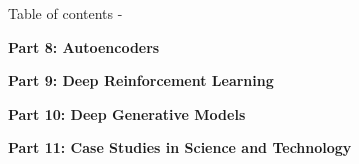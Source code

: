 \begin{frame}[allowframebreaks,t]{Table of contents -}
\vspace{0.2cm}

{\bf Part 8: Autoencoders}\\
\vspace{0.2cm}
\tableofcontents[part=8]

\vspace{0.2cm}

{\bf Part 9: Deep Reinforcement Learning}\\
\vspace{0.2cm}
\tableofcontents[part=9]

\vspace{0.2cm}

{\bf Part 10: Deep Generative Models}\\
\vspace{0.2cm}
\tableofcontents[part=10]

\vspace{0.2cm}

{\bf Part 11: Case Studies in Science and Technology}\\
\vspace{0.2cm}
\tableofcontents[part=11]

\vspace{0.5cm}

\tableofcontents[part=12]

\end{frame}

